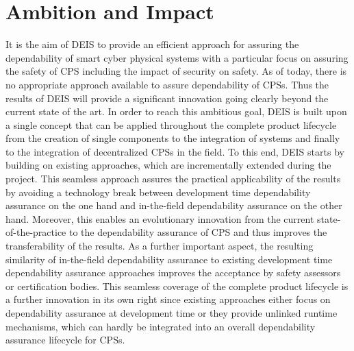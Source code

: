 \section{Ambition and Impact}
It is the aim of DEIS to provide an efficient approach for assuring the dependability of smart cyber physical systems with a particular focus on assuring the safety of CPS including the impact of security on safety. As of today, there is no appropriate approach available to assure dependability of CPSs. Thus the results of DEIS will provide a significant innovation going clearly beyond the current state of the art.
In order to reach this ambitious goal, DEIS is built upon a single concept that can be applied throughout the complete product lifecycle from the creation of single components to the integration of systems and finally to the integration of decentralized CPSs in the field. To this end, DEIS starts by building on existing approaches, which are incrementally extended during the project. This seamless approach assures the practical applicability of the results by avoiding a technology break between development time dependability assurance on the one hand and in-the-field dependability assurance on the other hand. Moreover, this enables an evolutionary innovation from the current state-of-the-practice to the dependability assurance of CPS and thus improves the transferability of the results. As a further important aspect, the resulting similarity of in-the-field dependability assurance to existing development time dependability assurance approaches improves the acceptance by safety assessors or certification bodies. This seamless coverage of the complete product lifecycle is a further innovation in its own right since existing approaches either focus on dependability assurance at development time or they provide unlinked runtime mechanisms, which can hardly be integrated into an overall dependability assurance lifecycle for CPSs.